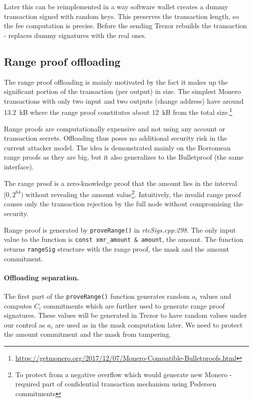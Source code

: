 \documentclass[]{article}
\begin{document}
Later this can be reimplemented in a way software wallet creates a dummy transaction signed with random keys. This preserves the transaction length, so the fee computation is precise. Before the sending Trezor rebuilds the transaction - replaces dummy signatures with the real ones.

\subsection{Range proof offloading}
The range proof offloading is mainly motivated by the fact it makes up the significant portion of the transaction (per output) in size. The simplest Monero transactions with only two input and two outputs (change address) have around 
13.2~kB where the range proof constitutes about 12~kB from the total size.\footnote{\url{https://getmonero.org/2017/12/07/Monero-Compatible-Bulletproofs.html}}
 
Range proofs are computationally expensive and not using any account or transaction secrets. Offloading thus poses no additional security risk in the current attacker model. The idea is demonstrated mainly on the Borromean range proofs as they are big, but it also generalizes to the Bulletproof (the same interface). 

The range proof is a zero-knowledge proof that the amount lies in the interval $[0, 2^{64})$ without revealing the amount value\footnote{To protect from a negative overflow which would generate new Monero - required part of confidential transaction mechanism using Pedersen commitments}. Intuitively, the invalid range proof causes only the transaction rejection by the full node without compromising the security.

Range proof is generated by \verb|proveRange()| in \emph{rtcSigs.cpp:298}. The only input value to the function is \verb|const xmr_amount & amount|, the amount. The function returns \verb|rangeSig| structure with the range proof, the mask and the amount commitment. 

\paragraph{Offloading separation.}
The first part of the \verb|proveRange()| function generates random $a_i$ values and computes $C_i$ commitments which are further used to generate range proof signatures. These values will be generated in Trezor to have random values under our control as $a_i$ are used as in the mask computation later. We need to protect the amount commitment and the mask from tampering.
\end{document}
